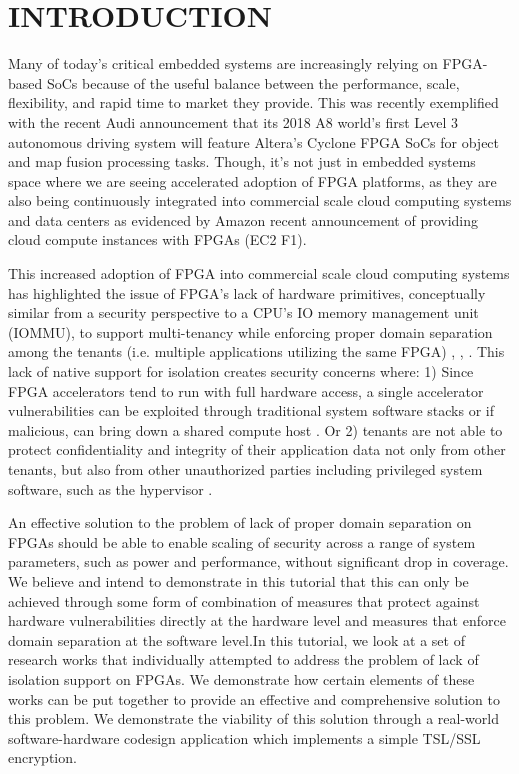 \documentclass[sigconf]{acmart}
\theoremstyle{plain}
\theoremstyle{remark}
\begin{document}
\maketitle


\section{INTRODUCTION}\label{sec:intro}
Many of today's critical embedded systems are increasingly relying on FPGA-based SoCs because of the useful balance between the performance, scale, flexibility, and rapid time to market they provide. This was recently exemplified with the recent Audi announcement that its 2018 A8 world's first Level 3 autonomous driving system will feature Altera's Cyclone FPGA SoCs for object and map fusion processing tasks. Though, it's not just in embedded systems space where we are seeing accelerated adoption of FPGA platforms, as they are also being continuously integrated into commercial scale cloud computing systems and data centers as evidenced by Amazon recent announcement of providing cloud compute instances with FPGAs (EC2 F1).

This increased adoption of FPGA into commercial scale cloud computing systems has highlighted the issue of FPGA's lack of hardware primitives, conceptually similar from a security perspective to a CPU's IO memory management unit (IOMMU), to support multi-tenancy while enforcing proper domain separation among the tenants (i.e. multiple applications utilizing the same FPGA) \cite{CloudFPGA}, \cite{CapslHOST}, \cite{Byma2014FPGAsIT}. This lack of native support for isolation creates security concerns where: 1) Since FPGA accelerators tend to run with full hardware access, a single accelerator vulnerabilities can be exploited through traditional system software stacks or if malicious, can bring down a shared compute host \cite{CloudFPGA}. Or 2) tenants are not able to protect confidentiality and integrity of their application  data not only from other tenants, but also from other unauthorized parties including privileged system software, such as the hypervisor \cite{sconee}.

An effective solution to the problem of lack of proper domain separation on FPGAs should be able to enable scaling of security across a range of system parameters, such as power and performance, without significant drop in coverage. We believe and intend to demonstrate in this tutorial that this can only be achieved through some form of combination of measures that protect against hardware vulnerabilities directly at the hardware level and measures that enforce domain separation at the software level.In this tutorial, we look at a set of  research works that individually attempted to address the problem of lack of isolation support on FPGAs. We demonstrate how certain elements of these works can be put together to provide an effective and comprehensive solution to this problem. We demonstrate the viability of this solution through a real-world software-hardware codesign application which implements a simple TSL/SSL encryption.
\end{document}

